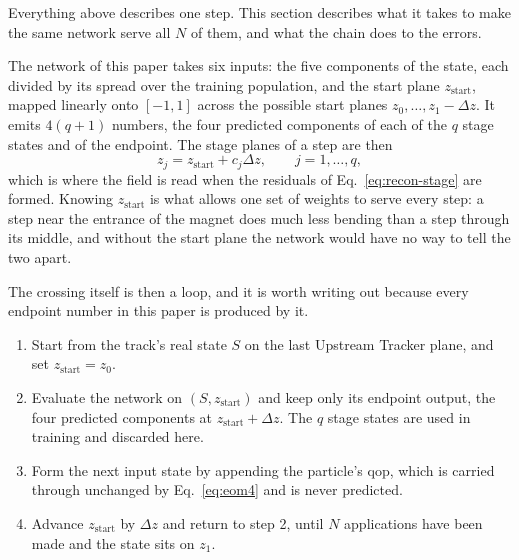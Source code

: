 \documentclass[11pt,a4paper]{article}
\newcommand{\qop}{\ensuremath{\mathrm{qop}}}
\begin{document}
Everything above describes one step. This section describes what it takes to
make the same network serve all $N$ of them, and what the chain does to the
errors.

The network of this paper takes six inputs: the five components of the state,
each divided by its spread over the training population, and the start plane
$z_{\mathrm{start}}$, mapped linearly onto $[-1, 1]$ across the possible start
planes $z_0, \dots, z_1 - \Delta z$. It emits $4(q+1)$ numbers, the four
predicted components of each of the $q$ stage states and of the endpoint. The
stage planes of a step are then
%
\begin{equation}
  z_j = z_{\mathrm{start}} + c_j \Delta z, \qquad j = 1, \dots, q,
  \label{eq:znodes}
\end{equation}
%
which is where the field is read when the residuals of
Eq.~\eqref{eq:recon-stage} are formed. Knowing $z_{\mathrm{start}}$ is what
allows one set of weights to serve every step: a step near the entrance of the
magnet does much less bending than a step through its middle, and without the
start plane the network would have no way to tell the two apart.

The crossing itself is then a loop, and it is worth writing out because every
endpoint number in this paper is produced by it.

\begin{enumerate}
  \item Start from the track's real state $S$ on the last Upstream Tracker
  plane, and set $z_{\mathrm{start}} = z_0$.
  \item Evaluate the network on $(S, z_{\mathrm{start}})$ and keep only its
  endpoint output, the four predicted components at
  $z_{\mathrm{start}} + \Delta z$. The $q$ stage states are used in training
  and discarded here.
  \item Form the next input state by appending the particle's $\qop$, which is
  carried through unchanged by Eq.~\eqref{eq:eom4} and is never predicted.
  \item Advance $z_{\mathrm{start}}$ by $\Delta z$ and return to step 2, until
  $N$ applications have been made and the state sits on $z_1$.
\end{enumerate}
\end{document}
